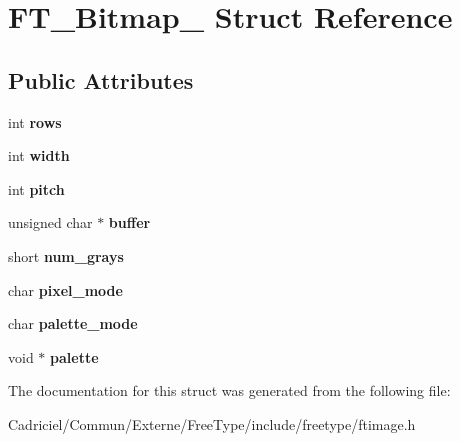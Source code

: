 \hypertarget{struct_f_t___bitmap__}{\section{F\-T\-\_\-\-Bitmap\-\_\- Struct Reference}
\label{struct_f_t___bitmap__}
}
\subsection*{Public Attributes}
\begin{DoxyCompactItemize}
\item 
\hypertarget{struct_f_t___bitmap___a1b6bb20b30fe087e3fc87a0eb37730c0}{int {\bfseries rows}}\label{struct_f_t___bitmap___a1b6bb20b30fe087e3fc87a0eb37730c0}

\item 
\hypertarget{struct_f_t___bitmap___a7b5e6252dd91a3809fe80ebbeb6720eb}{int {\bfseries width}}\label{struct_f_t___bitmap___a7b5e6252dd91a3809fe80ebbeb6720eb}

\item 
\hypertarget{struct_f_t___bitmap___afdee595846e1188c7a76d0cec9d85cf2}{int {\bfseries pitch}}\label{struct_f_t___bitmap___afdee595846e1188c7a76d0cec9d85cf2}

\item 
\hypertarget{struct_f_t___bitmap___a76439b1d3c13b81ca506108cd1623284}{unsigned char $\ast$ {\bfseries buffer}}\label{struct_f_t___bitmap___a76439b1d3c13b81ca506108cd1623284}

\item 
\hypertarget{struct_f_t___bitmap___a415d78060f8012d312703c9792ec005a}{short {\bfseries num\-\_\-grays}}\label{struct_f_t___bitmap___a415d78060f8012d312703c9792ec005a}

\item 
\hypertarget{struct_f_t___bitmap___a5cc5e0fe42a93a86e16706ad52e087a2}{char {\bfseries pixel\-\_\-mode}}\label{struct_f_t___bitmap___a5cc5e0fe42a93a86e16706ad52e087a2}

\item 
\hypertarget{struct_f_t___bitmap___ae7c8c74255cd27873b12a360cd5f3884}{char {\bfseries palette\-\_\-mode}}\label{struct_f_t___bitmap___ae7c8c74255cd27873b12a360cd5f3884}

\item 
\hypertarget{struct_f_t___bitmap___a8d5ecf4409f71bfb559e0d13d8df4d86}{void $\ast$ {\bfseries palette}}\label{struct_f_t___bitmap___a8d5ecf4409f71bfb559e0d13d8df4d86}

\end{DoxyCompactItemize}


The documentation for this struct was generated from the following file\-:\begin{DoxyCompactItemize}
\item 
Cadriciel/\-Commun/\-Externe/\-Free\-Type/include/freetype/ftimage.\-h\end{DoxyCompactItemize}
